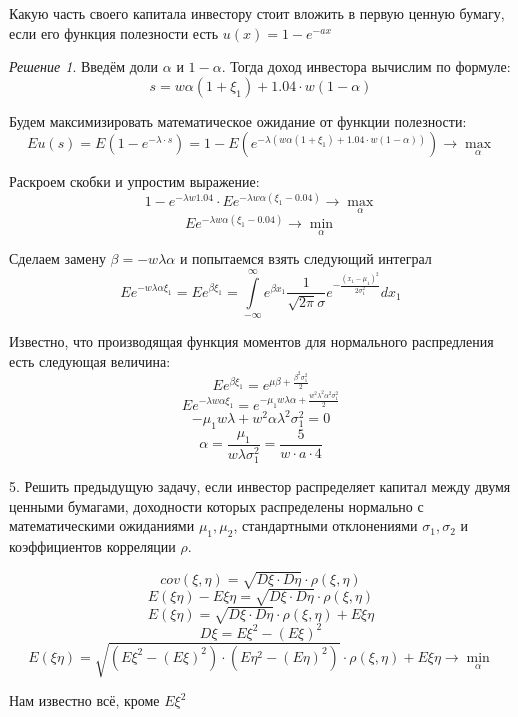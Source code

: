 \documentclass[%
12pt, %
final, %
oneside, %
onecolumn, %
centertags]{article} %
\theoremstyle{plain}
\theoremstyle{definition}
\theoremstyle{remark}
\newtheorem{solution}{Решение}
\begin{document}
Какую часть своего капитала инвестору стоит вложить в первую ценную бумагу, если его функция полезности есть $u(x) = 1 - e^{-ax}$
\begin{solution}
	Введём доли $\alpha$ и $1-\alpha$. Тогда доход инвестора вычислим по формуле:
	$$ s = w\alpha(1+\xi_1) + 1.04 \cdot w(1-\alpha)$$

	Будем максимизировать математическое ожидание от функции полезности:
	$$Eu(s) = E (1-e^{-\lambda \cdot s}) = 1 - E \left(e^{-\lambda \left(w\alpha(1+\xi_1) + 1.04 \cdot w(1-\alpha)\right)}\right) \to \underset{\alpha}{\max}$$

	Раскроем скобки и упростим выражение:
	$$1 - e^{-\lambda w 1.04} \cdot Ee^{-\lambda w \alpha (\xi_1 - 0.04)} \to \underset{\alpha}{\max}$$
	$$Ee^{-\lambda w \alpha (\xi_1 - 0.04)} \to \underset{\alpha}{\min}$$

	Сделаем замену $\beta = -w\lambda\alpha$ и попытаемся взять следующий интеграл
	$$Ee^{-w\lambda\alpha\xi_1} = Ee^{\beta \xi_1} = \int\limits_{-\infty}^{\infty} e^{\beta x_1}\frac{1}{\sqrt{2\pi}\sigma}e^{-\frac{(x_1-\mu_1)^2}{2\sigma_1^2}}dx_1$$

	Известно, что производящая функция моментов для нормального распредления есть следующая величина:
	$$Ee^{\beta \xi_1} = e^{\mu\beta + \frac{\beta^2 \sigma_1^2}{2}}$$
	$$Ee^{-\lambda w \alpha \xi_1} = e^{-\mu_1w\lambda\alpha + \frac{w^2 \lambda^2\alpha^2 \sigma_1^2}{2}}$$
	$$-\mu_1w\lambda + w^2 \alpha \lambda^2 \sigma_1^2 = 0$$
	$$\alpha = \frac{\mu_1}{w\lambda\sigma_1^2} = \frac{5}{w\cdot a \cdot 4}$$


\end{solution}

5. Решить предыдущую задачу, если инвестор распределяет капитал между двумя ценными бумагами, доходности которых распределены нормально с математическими ожиданиями $\mu_1,\mu_2$, стандартными отклонениями $\sigma_1, \sigma_2$ и коэффициентов корреляции $\rho$.

$$cov(\xi,\eta) = \sqrt{D\xi \cdot D\eta} \cdot \rho(\xi,\eta)$$
$$E(\xi\eta) - E\xi\eta = \sqrt{D\xi \cdot D\eta} \cdot \rho(\xi,\eta)$$
$$E(\xi\eta) = \sqrt{D\xi \cdot D\eta} \cdot \rho(\xi,\eta) + E\xi\eta$$
$$D\xi = E\xi^2 - (E\xi)^2$$
$$E(\xi\eta) = \sqrt{\left(E\xi^2 - (E\xi)^2\right)\cdot \left(E\eta^2 - (E\eta)^2\right)}\cdot \rho(\xi,\eta) + E\xi\eta \to \underset{\alpha}{\min}$$

Нам известно всё, кроме $E\xi^2$


\subsection{}
\end{document}
